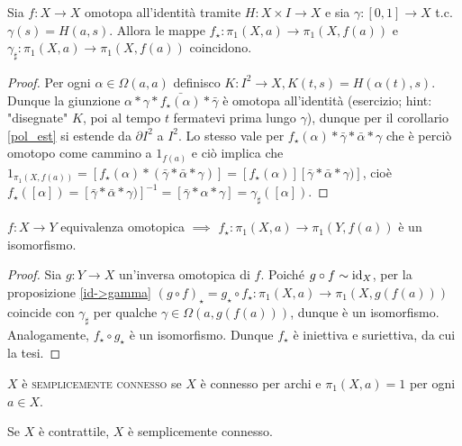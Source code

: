 \begin{prop} \label{id->gamma}
  Sia $f:X \longrightarrow X$ omotopa all'identità tramite $H: X \times I \longrightarrow X$ e sia $\gamma: [0, 1] \longrightarrow X$ t.c. $\gamma(s)=H(a, s)$. Allora le mappe $f_{\star}: \pi_1(X, a) \longrightarrow \pi_1(X, f(a))$ e $\gamma_{\sharp}: \pi_1(X, a) \longrightarrow \pi_1(X, f(a))$ coincidono.
\end{prop}

\begin{proof}
  Per ogni $\alpha \in \Omega(a, a)$ definisco $K: I^2 \longrightarrow X, K(t, s)=H(\alpha(t), s)$. Dunque la giunzione $\alpha * \gamma * \bar{f_{\star}(\alpha)} * \bar{\gamma}$ è omotopa all'identità (esercizio; hint: "disegnate" $K$, poi al tempo $t$ fermatevi prima lungo $\gamma$), dunque per il corollario \ref{pol_est} si estende da $\partial I^2$ a $I^2$. Lo stesso vale per
  $f_{\star}(\alpha) * \bar{\gamma} * \bar{\alpha} * \gamma$ che è perciò omotopo come cammino a $1_{f(a)}$ e ciò implica che
  $1_{\pi_1(X, f(a))}=[f_{\star}(\alpha) * (\bar{\gamma} * \bar{\alpha} * \gamma)]=[f_{\star}(\alpha)][\bar{\gamma} * \bar{\alpha} * \gamma)]$, cioè
  $f_{\star}([\alpha])=[\bar{\gamma} * \bar{\alpha} * \gamma)]^{-1}=[\bar{\gamma} * \alpha * \gamma]=\gamma_{\sharp}([\alpha])$.
\end{proof}

\begin{thm} \label{eq_omo->iso}
  $f: X \longrightarrow Y$ equivalenza omotopica $\implies$ $f_{\star}: \pi_1(X, a) \longrightarrow \pi_1(Y, f(a))$ è un isomorfismo.
\end{thm}

\begin{proof}
  Sia $g: Y \longrightarrow X$ un'inversa omotopica di $f$. Poiché $g \circ f \sim \operatorname{id}_X$, per la proposizione \ref{id->gamma} $(g \circ f)_{\star}=g_{\star} \circ f_{\star}: \pi_1(X, a) \longrightarrow \pi_1(X, g(f(a)))$ coincide con $\gamma_{\sharp}$ per qualche $\gamma \in \Omega(a, g(f(a)))$, dunque è un isomorfismo.
  Analogamente, $f_{\star} \circ g_{\star}$ è un isomorfismo. Dunque $f_{\star}$ è iniettiva e suriettiva, da cui la tesi.
\end{proof}

\begin{defn}
  $X$ è \textsc{semplicemente connesso} se $X$ è connesso per archi e $\pi_1(X, a)={1}$ per ogni $a \in X$.
\end{defn}

\begin{cor}
  Se $X$ è contrattile, $X$ è semplicemente connesso.
\end{cor}

